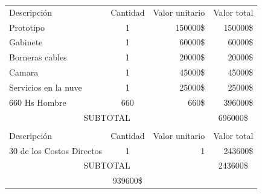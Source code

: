 \documentclass[11pt]{charter}
\begin{document}
\begin{table}[htpb]
\centering
\begin{tabularx}{\linewidth}{@{}|X|c|r|r|@{}}
\hline
\rowcolor[HTML]{C0C0C0} 
\multicolumn{4}{|c|}{\cellcolor[HTML]{C0C0C0}COSTOS DIRECTOS} \\ \hline
\rowcolor[HTML]{C0C0C0} 
Descripción &
  \multicolumn{1}{c|}{\cellcolor[HTML]{C0C0C0}Cantidad} &
  \multicolumn{1}{c|}{\cellcolor[HTML]{C0C0C0}Valor unitario} &
  \multicolumn{1}{c|}{\cellcolor[HTML]{C0C0C0}Valor total} \\ \hline

  
\multicolumn{1}{|l|}{Prototipo}				&1	&150000\$	&150000\$	\\ \hline
\multicolumn{1}{|l|}{Gabinete}				&1	&60000\$		&60000\$		\\ \hline
\multicolumn{1}{|l|}{Borneras cables}			&1	&20000\$		&20000\$		\\ \hline
\multicolumn{1}{|l|}{Camara}					&1	&45000\$		&45000\$		\\ \hline
\multicolumn{1}{|l|}{Servicios en la nuve}	&1	&25000\$		&25000\$		\\ \hline
\multicolumn{1}{|l|}{660 Hs Hombre}    			&660	&660\$		&396000\$	\\ \hline
\multicolumn{3}{|c|}{SUBTOTAL} &
\multicolumn{1}{c|}{696000\$} \\ \hline

\rowcolor[HTML]{C0C0C0} 
\multicolumn{4}{|c|}{\cellcolor[HTML]{C0C0C0}COSTOS INDIRECTOS} \\ \hline
\rowcolor[HTML]{C0C0C0} 
Descripción &  
  \multicolumn{1}{c|}{\cellcolor[HTML]{C0C0C0}Cantidad} &
  \multicolumn{1}{c|}{\cellcolor[HTML]{C0C0C0}Valor unitario} &
  \multicolumn{1}{c|}{\cellcolor[HTML]{C0C0C0}Valor total} \\ \hline
\multicolumn{1}{|l|}{30 de los Costos Directos } &1   &1   &243600\$
   \\ \hline

\multicolumn{3}{|c|}{SUBTOTAL} &
  \multicolumn{1}{c|}{243600\$} \\ \hline
\rowcolor[HTML]{C0C0C0}
\multicolumn{3}{|c|}{TOTAL} & 939600\$
   \\ \hline
\end{tabularx}%
\end{table}
\newpage
\end{document}
